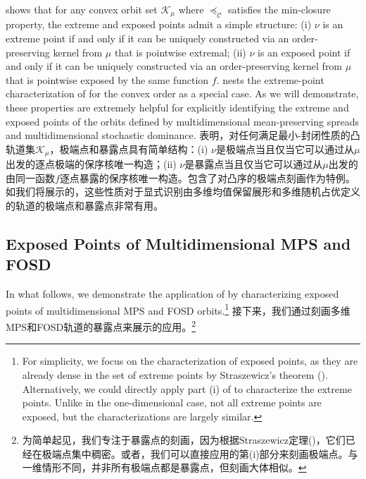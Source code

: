 \documentclass[12pt,letterpaper]{article}
\newenvironment{original}{\color{black}}{}
\newenvironment{translation}{\color{blue}}{}
\theoremstyle{plain}
\theoremstyle{definition}
\theoremstyle{remark}
\newcommand{\C}{\mathcal{C}}
\theoremstyle{definition}
\begin{document}
\begin{original}
 shows that for any convex orbit set $\mathcal{K}_\mu$ where $\preceq_\C$ satisfies the min-closure property, the extreme and exposed points admit a simple structure: (i) $\nu$ is an extreme point if and only if it can be uniquely constructed via an order-preserving kernel from $\mu$ that is pointwise extremal; (ii) $\nu$ is an exposed point if and only if it can be uniquely constructed via an order-preserving kernel from $\mu$ that is pointwise exposed by the same function $f$.  nests the extreme-point characterization of \citet{roy1976extremal} for the convex order as a special case. As we will demonstrate, these properties are extremely helpful for explicitly identifying the extreme and exposed points of the orbits defined by multidimensional mean-preserving spreads and multidimensional stochastic dominance.
\end{original}
\begin{translation}
表明，对任何满足最小-封闭性质的凸轨道集$\mathcal{K}_\mu$，极端点和暴露点具有简单结构：(i) $\nu$是极端点当且仅当它可以通过从$\mu$出发的逐点极端的保序核唯一构造；(ii) $\nu$是暴露点当且仅当它可以通过从$\mu$出发的由同一函数$f$逐点暴露的保序核唯一构造。包含了\citet{roy1976extremal}对凸序的极端点刻画作为特例。如我们将展示的，这些性质对于显式识别由多维均值保留展形和多维随机占优定义的轨道的极端点和暴露点非常有用。
\end{translation}

\subsection{Exposed Points of Multidimensional MPS and FOSD}
\begin{original}
In what follows, we demonstrate the application of  by characterizing exposed points of multidimensional MPS and FOSD orbits.\footnote{For simplicity, we focus on the characterization of exposed points, as they are already dense in the set of extreme points by Straszewicz's theorem (\citealt{Kleejr1958}). Alternatively, we could directly apply part (i) of  to characterize the extreme points. Unlike in the one-dimensional case, not all extreme points are exposed, but the characterizations are largely similar.}
\end{original}
\begin{translation}
接下来，我们通过刻画多维MPS和FOSD轨道的暴露点来展示的应用。\footnote{为简单起见，我们专注于暴露点的刻画，因为根据Straszewicz定理(\citealt{Kleejr1958})，它们已经在极端点集中稠密。或者，我们可以直接应用的第(i)部分来刻画极端点。与一维情形不同，并非所有极端点都是暴露点，但刻画大体相似。}
\end{translation}
\end{document}
